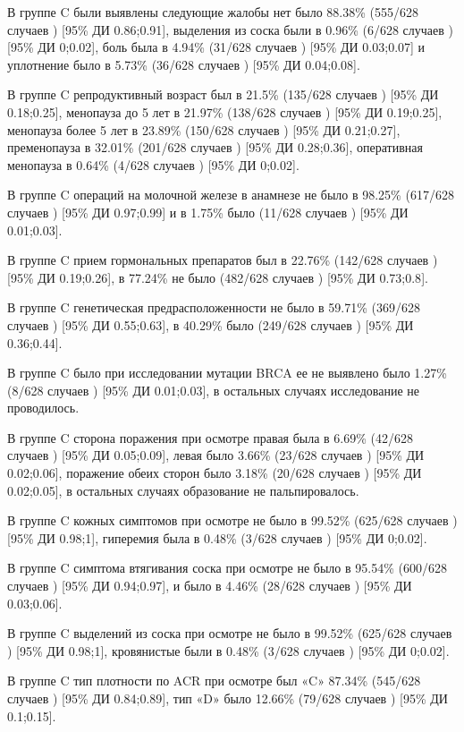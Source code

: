 \documentclass[
]{article}
\begin{document}
В группе C были выявлены следующие жалобы нет было 88.38\% (555/628
случаев ) {[}95\% ДИ 0.86;0.91{]}, выделения из соска были в 0.96\%
(6/628 случаев ) {[}95\% ДИ 0;0.02{]}, боль была в 4.94\% (31/628
случаев ) {[}95\% ДИ 0.03;0.07{]} и уплотнение было в 5.73\% (36/628
случаев ) {[}95\% ДИ 0.04;0.08{]}.

В группе C репродуктивный возраст был в 21.5\% (135/628 случаев )
{[}95\% ДИ 0.18;0.25{]}, менопауза до 5 лет в 21.97\% (138/628 случаев )
{[}95\% ДИ 0.19;0.25{]}, менопауза более 5 лет в 23.89\% (150/628
случаев ) {[}95\% ДИ 0.21;0.27{]}, пременопауза в 32.01\% (201/628
случаев ) {[}95\% ДИ 0.28;0.36{]}, оперативная менопауза в 0.64\% (4/628
случаев ) {[}95\% ДИ 0;0.02{]}.

В группе C операций на молочной железе в анамнезе не было в 98.25\%
(617/628 случаев ) {[}95\% ДИ 0.97;0.99{]} и в 1.75\% было (11/628
случаев ) {[}95\% ДИ 0.01;0.03{]}.

В группе C прием гормональных препаратов был в 22.76\% (142/628 случаев
) {[}95\% ДИ 0.19;0.26{]}, в 77.24\% не было (482/628 случаев ) {[}95\%
ДИ 0.73;0.8{]}.

В группе C генетическая предрасположенности не было в 59.71\% (369/628
случаев ) {[}95\% ДИ 0.55;0.63{]}, в 40.29\% было (249/628 случаев )
{[}95\% ДИ 0.36;0.44{]}.

В группе C было при исследовании мутации BRCA ее не выявлено было 1.27\%
(8/628 случаев ) {[}95\% ДИ 0.01;0.03{]}, в остальных случаях
исследование не проводилось.

В группе C сторона поражения при осмотре правая была в 6.69\% (42/628
случаев ) {[}95\% ДИ 0.05;0.09{]}, левая было 3.66\% (23/628 случаев )
{[}95\% ДИ 0.02;0.06{]}, поражение обеих сторон было 3.18\% (20/628
случаев ) {[}95\% ДИ 0.02;0.05{]}, в остальных случаях образование не
пальпировалось.

В группе C кожных симптомов при осмотре не было в 99.52\% (625/628
случаев ) {[}95\% ДИ 0.98;1{]}, гиперемия была в 0.48\% (3/628 случаев )
{[}95\% ДИ 0;0.02{]}.

В группе C симптома втягивания соска при осмотре не было в 95.54\%
(600/628 случаев ) {[}95\% ДИ 0.94;0.97{]}, и было в 4.46\% (28/628
случаев ) {[}95\% ДИ 0.03;0.06{]}.

В группе C выделений из соска при осмотре не было в 99.52\% (625/628
случаев ) {[}95\% ДИ 0.98;1{]}, кровянистые были в 0.48\% (3/628 случаев
) {[}95\% ДИ 0;0.02{]}.

В группе C тип плотности по ACR при осмотре был «C» 87.34\% (545/628
случаев ) {[}95\% ДИ 0.84;0.89{]}, тип «D» было 12.66\% (79/628 случаев
) {[}95\% ДИ 0.1;0.15{]}.
\end{document}
